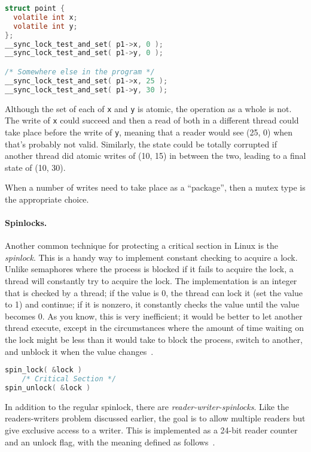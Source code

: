 \begin{lstlisting}[language=C]
struct point {
  volatile int x;
  volatile int y;
};
__sync_lock_test_and_set( p1->x, 0 );
__sync_lock_test_and_set( p1->y, 0 );

/* Somewhere else in the program */
__sync_lock_test_and_set( p1->x, 25 );
__sync_lock_test_and_set( p1->y, 30 );
\end{lstlisting}

Although the set of each of \texttt{x} and \texttt{y} is atomic, the operation as a whole is not. The write of \texttt{x} could succeed and then a read of both in a different thread could take place before the write of \texttt{y}, meaning that a reader would see (25, 0) when that's probably not valid. Similarly, the state could be totally corrupted if another thread did atomic writes of (10, 15) in between the two, leading to a final state of (10, 30).

When a number of writes need to take place as a ``package'', then a mutex type is the appropriate choice.

\paragraph{Spinlocks.}
Another common technique for protecting a critical section in Linux is the \textit{spinlock}. This is a handy way to implement constant checking to acquire a lock. Unlike semaphores where the process is blocked if it fails to acquire the lock, a thread will constantly try to acquire the lock. The implementation is an integer that is checked by a thread; if the value is 0, the thread can lock it (set the value to 1) and continue; if it is nonzero, it constantly checks the value until the value becomes 0. As you know, this is very inefficient; it would be better to let another thread execute, except in the circumstances where the amount of time waiting on the lock might be less than it would take to block the process, switch to another, and unblock it when the value changes~\cite{osi}.

\begin{lstlisting}[language=C]
spin_lock( &lock )
    /* Critical Section */
spin_unlock( &lock )
\end{lstlisting}

In addition to the regular spinlock, there are \textit{reader-writer-spinlocks}. Like the readers-writers problem discussed earlier, the goal is to allow multiple readers but give exclusive access to a writer. This is implemented as a 24-bit reader counter and an unlock flag, with the meaning defined as follows~\cite{osi}.

